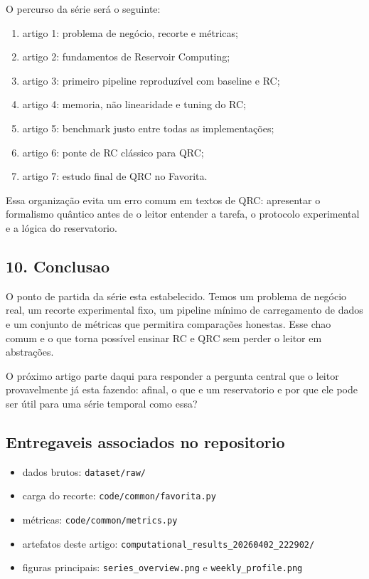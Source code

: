 \documentclass[12pt]{article}
\providecommand{\tightlist}{%
          \setlength{\itemsep}{0pt}\setlength{\parskip}{0pt}}
\begin{document}
O percurso da série será o seguinte:

\begin{enumerate}
\def\labelenumi{\arabic{enumi}.}
\tightlist
\item
  artigo 1: problema de negócio, recorte e métricas;
\item
  artigo 2: fundamentos de Reservoir Computing;
\item
  artigo 3: primeiro pipeline reproduzível com baseline e RC;
\item
  artigo 4: memoria, não linearidade e tuning do RC;
\item
  artigo 5: benchmark justo entre todas as implementações;
\item
  artigo 6: ponte de RC clássico para QRC;
\item
  artigo 7: estudo final de QRC no Favorita.
\end{enumerate}

Essa organização evita um erro comum em textos de QRC: apresentar o formalismo quântico antes de o leitor entender a tarefa, o protocolo experimental e a lógica do reservatorio.

\subsection{10. Conclusao}\label{10-conclusao}

O ponto de partida da série esta estabelecido. Temos um problema de negócio real, um recorte experimental fixo, um pipeline mínimo de carregamento de dados e um conjunto de métricas que permitira comparações honestas. Esse chao comum e o que torna possível ensinar RC e QRC sem perder o leitor em abstrações.

O próximo artigo parte daqui para responder a pergunta central que o leitor provavelmente já esta fazendo: afinal, o que e um reservatorio e por que ele pode ser útil para uma série temporal como essa?

\subsection{Entregaveis associados no repositorio}\label{entregaveis-associados-no-repositorio}

\begin{itemize}
\tightlist
\item
  dados brutos: \texttt{dataset/raw/}
\item
  carga do recorte: \texttt{code/common/favorita.py}
\item
  métricas: \texttt{code/common/metrics.py}
\item
  artefatos deste artigo: \texttt{computational\_results\_20260402\_222902/}
\item
  figuras principais: \texttt{series\_overview.png} e \texttt{weekly\_profile.png}
\end{itemize}
\end{document}
